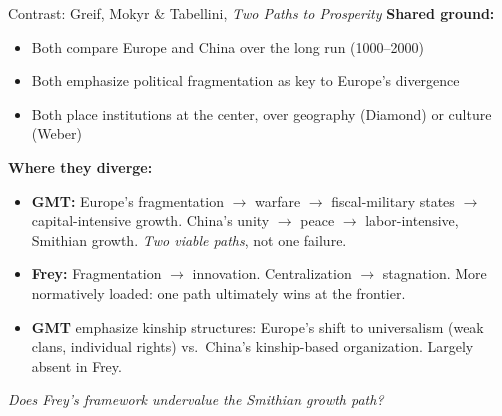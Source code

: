 \documentclass[aspectratio=169, 11pt]{beamer}
\begin{document}
\begin{frame}{Contrast: Greif, Mokyr \& Tabellini, \textit{Two Paths to Prosperity}}
    \small
    \textbf{Shared ground:}
    \begin{itemize}
        \item Both compare Europe and China over the long run (1000--2000)
        \item Both emphasize political fragmentation as key to Europe's divergence
        \item Both place institutions at the center, over geography (Diamond) or culture (Weber)
    \end{itemize}

    \vspace{0.5em}

    \textbf{Where they diverge:}
    \begin{itemize}
        \item \textbf{GMT:} Europe's fragmentation $\rightarrow$ warfare $\rightarrow$ fiscal-military states $\rightarrow$ capital-intensive growth. China's unity $\rightarrow$ peace $\rightarrow$ labor-intensive, Smithian growth. \textit{Two viable paths}, not one failure.
        \item \textbf{Frey:} Fragmentation $\rightarrow$ innovation. Centralization $\rightarrow$ stagnation. More normatively loaded: one path ultimately wins at the frontier.
        \item \textbf{GMT} emphasize kinship structures: Europe's shift to universalism (weak clans, individual rights) vs.\ China's kinship-based organization. Largely absent in Frey.
    \end{itemize}

    \vspace{0.3em}
    \begin{center}
        \textit{Does Frey's framework undervalue the Smithian growth path?}
    \end{center}
\end{frame}

\end{document}
